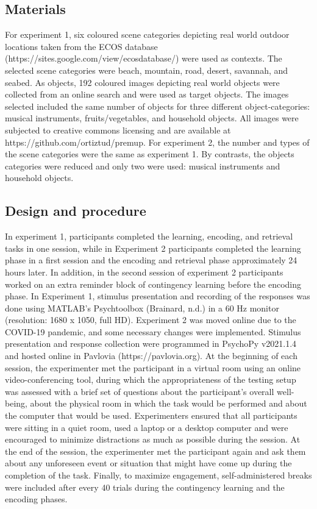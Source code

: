 \documentclass[a4paper,12pt]{article} 			%
\begin{document}
\subsection{Materials}
For experiment 1, six coloured scene categories depicting real world outdoor locations taken from the ECOS database (https://sites.google.com/view/ecosdatabase/) were used as contexts. The selected scene categories were beach, mountain, road, desert, savannah, and seabed. As objects, 192 coloured images depicting real world objects were collected from an online search and were used as target objects. The images selected included the same number of objects for three different object-categories: musical instruments, fruits/vegetables, and household objects. All images were subjected to creative commons licensing and are available at https://github.com/ortiztud/premup. 
For experiment 2, the number and types of the scene categories were the same as experiment 1. By contrasts, the objects categories were reduced and only two were used: musical instruments and household objects. 
\subsection{Design and procedure}
In experiment 1, participants completed the learning, encoding, and retrieval tasks in one session, while in Experiment 2 participants completed the learning phase in a first session and the encoding and retrieval phase approximately 24 hours later. In addition, in the second session of experiment 2 participants worked on an extra reminder block of contingency learning before the encoding phase. 
In Experiment 1, stimulus presentation and recording of the responses was done using MATLAB’s Psychtoolbox (Brainard, n.d.) in a 60 Hz monitor (resolution: 1680 x 1050, full HD). 
 Experiment 2 was moved online due to the COVID-19 pandemic, and some necessary changes were implemented. Stimulus presentation and response collection were programmed in PsychoPy v2021.1.4 and hosted online in Pavlovia (https://pavlovia.org). At the beginning of each session, the experimenter met the participant in a virtual room using an online video-conferencing tool, during which the appropriateness of the testing setup was assessed with a brief set of questions about the participant’s overall well-being, about the physical room in which the task would be performed and about the computer that would be used. Experimenters ensured that all participants were sitting in a quiet room, used a laptop or a desktop computer and were encouraged to minimize distractions as much as possible during the session. At the end of the session, the experimenter met the participant again and ask them about any unforeseen event or situation that might have come up during the completion of the task. Finally, to maximize engagement, self-administered breaks were included after every 40 trials during the contingency learning and the encoding phases. 
\end{document}
